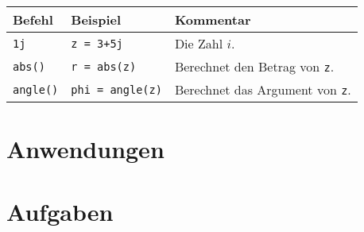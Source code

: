 \begin{table}[H]
    \centering
    \begin{tabular}{|p{3cm}|p{6cm}|p{6cm}|}
        \hline
    \textbf{Befehl} & \textbf{Beispiel} & \textbf{Kommentar} \\ \hline
    
    \texttt{1j} & \texttt{z = 3+5j} & Die Zahl $i$. \\ \hline
    \texttt{abs()} & \texttt{r = abs(z)} & Berechnet den Betrag von \texttt{z}. \\ \hline
    \texttt{angle()} & \texttt{phi = angle(z)} & Berechnet das Argument von \texttt{z}. \\ \hline


    \end{tabular}
\end{table}





\section{Anwendungen}\label{sec:anwendungen}

\section{Aufgaben}


